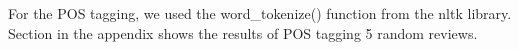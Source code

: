 For the POS tagging, we used the word\_tokenize() function from the nltk library. Section in the appendix shows the results of POS tagging 5 random reviews.\\
